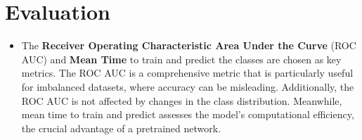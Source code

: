 \documentclass[a4paper]{article}
\begin{document}
\section*{Evaluation}
\begin{itemize}
\item The \textbf{Receiver Operating Characteristic Area Under the Curve} (ROC AUC) and \textbf{Mean Time} to train and predict the classes are chosen as key metrics. The ROC AUC is a comprehensive metric that is particularly useful for imbalanced datasets, where accuracy can be misleading. Additionally, the ROC AUC is not affected by changes in the class distribution. Meanwhile, mean time to train and predict assesses the model's computational efficiency, the crucial advantage of a pretrained network.
\end{itemize}

\nocite{*}


\end{document}
